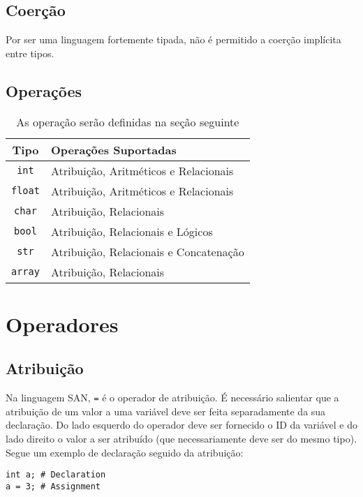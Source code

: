 \documentclass[a4paper,11pt]{article}
\begin{document}
\subsection{Coerção}
Por ser uma linguagem fortemente tipada, não é permitido a coerção implícita entre tipos.

\subsection{Operações}
\begin{table}[h!]
    \centering
    \begin{tabular}{|c|l|}
         \hline
         \textbf{Tipo} & \textbf{Operações Suportadas}\\
         \hline
         \texttt{int} & Atribuição, Aritméticos e Relacionais\\
         \hline
         \texttt{float} & Atribuição, Aritméticos e Relacionais\\
         \hline
         \texttt{char} & Atribuição, Relacionais\\
         \hline
         \texttt{bool} & Atribuição, Relacionais e Lógicos\\
         \hline
         \texttt{str} & Atribuição, Relacionais e Concatenação\\
         \hline
         \texttt{array} & Atribuição, Relacionais\\
         \hline
    \end{tabular}
    \caption{As operação serão definidas na seção seguinte}
\end{table}

\section{Operadores}
\subsection{Atribuição}
Na linguagem SAN, \texttt{=} é o operador de atribuição. É necessário salientar que a atribuição
de um valor a uma variável deve ser feita separadamente da sua declaração. Do lado esquerdo do
operador deve ser fornecido o ID da variável e do lado direito o valor a ser atribuído (que
necessariamente deve ser do mesmo tipo). Segue um exemplo de declaração seguido da atribuição:

\begin{lstlisting}
int a; # Declaration
a = 3; # Assignment
\end{lstlisting}
\end{document}
